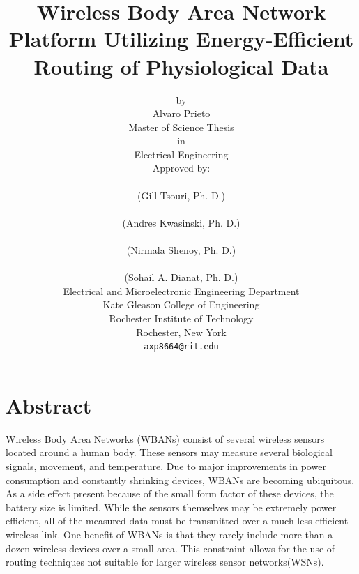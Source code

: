 \documentclass{article}
\begin{document}
\title{Wireless Body Area Network Platform Utilizing Energy-Efficient Routing of Physiological Data}
\author{by\\
Alvaro Prieto\\
Master of Science Thesis\\
in\\
Electrical Engineering\\
Approved by:\\
\makebox[3.5in]{\hrulefill}\\
(Gill Tsouri, Ph. D.)\\
\makebox[3.5in]{\hrulefill}\\
(Andres Kwasinski, Ph. D.)\\
\makebox[3.5in]{\hrulefill}\\
(Nirmala Shenoy, Ph. D.)\\
\makebox[3.5in]{\hrulefill}\\
(Sohail A. Dianat, Ph. D.)\\
Electrical and Microelectronic Engineering Department\\
Kate Gleason College of Engineering\\
Rochester Institute of Technology\\
Rochester, New York\\
\texttt{axp8664@rit.edu}}

\maketitle
\thispagestyle{empty}

\pagebreak

\tableofcontents

\pagebreak

\section*{Abstract}
Wireless Body Area Networks (WBANs) consist of several wireless sensors located around a human body. These sensors may measure several biological signals, movement, and temperature. Due to major improvements in power consumption and constantly shrinking devices, WBANs are becoming ubiquitous. As a side effect present because of the small form factor of these devices, the battery size is limited. While the sensors themselves may be extremely power efficient, all of the measured data must be transmitted over a much less efficient wireless link. One benefit of WBANs is that they rarely include more than a dozen wireless devices over a small area. This constraint allows for the use of routing techniques not suitable for larger wireless sensor networks(WSNs).
\end{document}
